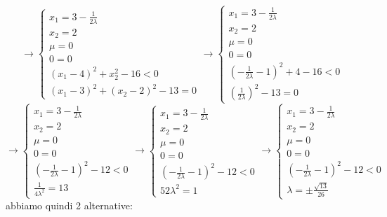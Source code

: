 \documentclass[a4paper,12pt, oneside]{book}
\begin{document}
\[\to
  \begin{cases}
    x_1=3-\frac{1}{2\lambda}\\
    x_2=2\\
    \mu=0\\
    0=0\\
    (x_1-4)^2+x_2^2-16 < 0\\
    (x_1-3)^2+(x_2-2)^2-13=0
  \end{cases}\to\begin{cases}
    x_1=3-\frac{1}{2\lambda}\\
    x_2=2\\
    \mu=0\\
    0=0\\
    (-\frac{1}{2\lambda}-1)^2+4-16 < 0\\
    (\frac{1}{2\lambda})^2-13=0
  \end{cases}
\]
\[\to
  \begin{cases}
    x_1=3-\frac{1}{2\lambda}\\
    x_2=2\\
    \mu=0\\
    0=0\\
    (-\frac{1}{2\lambda}-1)^2-12 < 0\\
    \frac{1}{4\lambda^2}=13
  \end{cases}\to\begin{cases}
    x_1=3-\frac{1}{2\lambda}\\
    x_2=2\\
    \mu=0\\
    0=0\\
    (-\frac{1}{2\lambda}-1)^2-12 < 0\\
    52\lambda^2=1
  \end{cases}\to\begin{cases}
    x_1=3-\frac{1}{2\lambda}\\
    x_2=2\\
    \mu=0\\
    0=0\\
    (-\frac{1}{2\lambda}-1)^2-12 < 0\\
    \lambda =\pm \frac{\sqrt{13}}{26}
  \end{cases}
\]
abbiamo quindi 2 alternative:
\end{document}
